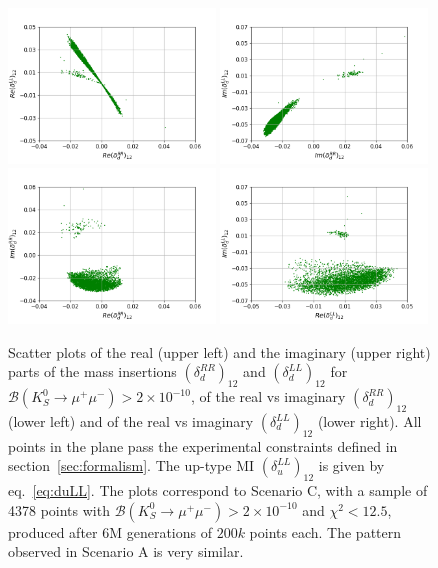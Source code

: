 \begin{figure}
\centering
\includegraphics[width=0.49\textwidth]{figs/rddRR12_vs_rddLL12.png}
\includegraphics[width=0.49\textwidth]{figs/iddRR12_vs_iddLL12.png}
\includegraphics[width=0.49\textwidth]{figs/rddRR12_vs_iddRR12.png}
\includegraphics[width=0.49\textwidth]{figs/rddLL12_vs_iddLL12.png}
 	\caption{\label{fig:strips} Scatter plots of the real (upper left) and the imaginary (upper right) parts of the mass insertions $\left(\delta_d^{RR}\right)_{12}$ and $\left(\delta_d^{LL}\right)_{12}$ for $\mathcal{B}(K_S^0\rightarrow\mu^+\mu^-) > 2\times10^{-10}$, of the real vs imaginary $\left(\delta_d^{RR}\right)_{12}$ (lower  left) and of the real vs imaginary $\left(\delta_d^{LL}\right)_{12}$ (lower right). All points in the plane pass the experimental constraints defined in section~\ref{sec:formalism}. The up-type MI $(\delta_u^{LL})_{12}$ is given by eq.~\eqref{eq:duLL}. The plots correspond to Scenario C, with a sample of 4378 points with $\mathcal{B}(K_S^0\rightarrow\mu^+\mu^-) > 2\times10^{-10}$ and $\chi^2<12.5$, produced after 6M generations of $200k$ points each. The pattern observed in Scenario A is very similar.}
\end{figure}

